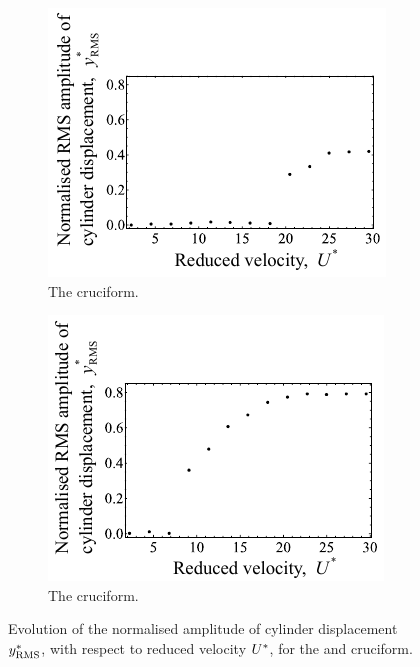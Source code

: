 \documentclass[oneside]{utmthesis}
\begin{document}
\begin{figure}
  \centering
  \begin{subfigure}[h]{0.4\textwidth}
    \includegraphics[width=\textwidth]{figs/yStrRMS4}
  \caption{The \angtw{} cruciform.}
    \label{fig:yStrRMS4}
  \end{subfigure}
  \hspace{6mm}
  \begin{subfigure}[h]{0.4\textwidth}
    \includegraphics[width=\textwidth]{figs/yStrRMS5}
    \caption{The \angon{} cruciform.}
    \label{fig:yStrRMS5}
  \end{subfigure}

  \caption{Evolution of the normalised \rms{} amplitude of cylinder displacement $y^{*}_{\text{RMS}}$, with respect to reduced velocity $U^{*}$, for the \angtw{} and \angon{} cruciform.}
  \label{fig:yStrRMS45}
\end{figure}
\end{document}
